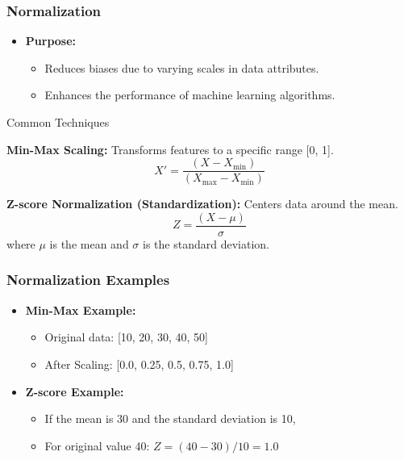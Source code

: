 \documentclass[aspectratio=169]{beamer}
\begin{document}
\begin{frame}[fragile]
    \frametitle{Normalization}
    \begin{itemize}
        \item \textbf{Purpose:}
        \begin{itemize}
            \item Reduces biases due to varying scales in data attributes.
            \item Enhances the performance of machine learning algorithms.
        \end{itemize}
    \end{itemize}
    
    \begin{block}{Common Techniques}
        \item \textbf{Min-Max Scaling:} Transforms features to a specific range [0, 1].
        \begin{equation}
            X' = \frac{(X - X_{\text{min}})}{(X_{\text{max}} - X_{\text{min}})}
        \end{equation}
        \item \textbf{Z-score Normalization (Standardization):} Centers data around the mean.
        \begin{equation}
            Z = \frac{(X - \mu)}{\sigma}
        \end{equation}
        where $\mu$ is the mean and $\sigma$ is the standard deviation.
    \end{block}
\end{frame}

\begin{frame}[fragile]
    \frametitle{Normalization Examples}
    \begin{itemize}
        \item \textbf{Min-Max Example:}
        \begin{itemize}
            \item Original data: [10, 20, 30, 40, 50]
            \item After Scaling: [0.0, 0.25, 0.5, 0.75, 1.0]
        \end{itemize}
        \item \textbf{Z-score Example:}
        \begin{itemize}
            \item If the mean is 30 and the standard deviation is 10, 
            \item For original value 40: $Z = (40 - 30) / 10 = 1.0$
        \end{itemize}
    \end{itemize}
\end{frame}
\end{document}
